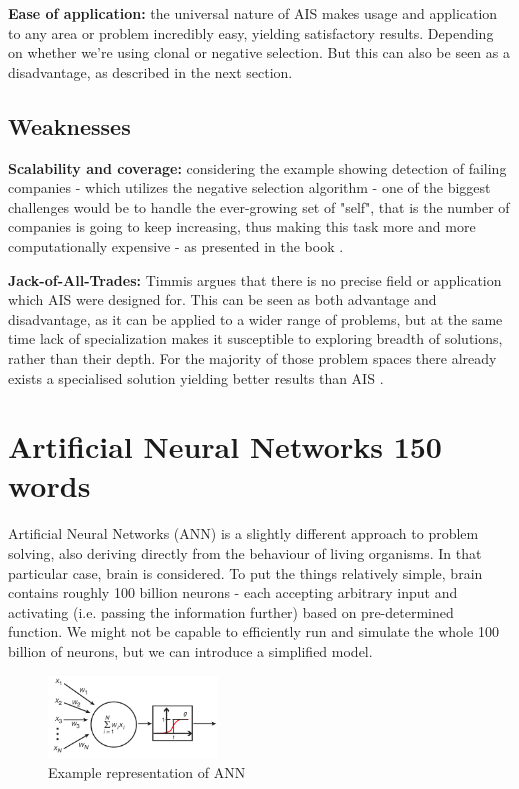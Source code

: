 \documentclass[letterpaper, 10 pt, conference]{ieeeconf}  %
\begin{document}
\textbf{Ease of application:} the universal nature of AIS makes usage and application to any area or problem incredibly easy, yielding satisfactory results. Depending on whether we're using clonal or negative selection. But this can also be seen as a disadvantage, as described in the next section.

\subsection{Weaknesses}
\textbf{Scalability and coverage:} considering the example showing detection of failing companies - which utilizes the negative selection algorithm - one of the biggest challenges would be to handle the ever-growing set of "self", that is the number of companies is going to keep increasing, thus making this task more and more computationally expensive - as presented in the book \cite{brabazon2006biologically}.

\textbf{Jack-of-All-Trades:} Timmis argues \cite{timmis2004overview} that there is no precise field or application which AIS were designed for. This can be seen as both advantage and disadvantage, as it can be applied to a wider range of problems, but at the same time lack of specialization makes it susceptible to exploring breadth of solutions, rather than their depth. For the majority of those problem spaces there already exists a specialised solution yielding better results than AIS \cite{garrett2005we}.

\section{Artificial Neural Networks 150 words}
Artificial Neural Networks (ANN) is a slightly different approach to problem solving, also deriving directly from the behaviour of living organisms. In that particular case, brain is considered. To put the things relatively simple, brain contains roughly 100 billion neurons \cite{lent2012many} - each accepting arbitrary input and activating (i.e. passing the information further) based on pre-determined function. We might not be capable to efficiently run and simulate the whole 100 billion of neurons, but we can introduce a simplified model.

\begin{figure}[h!]
  \centering
  \includegraphics[width=0.4\textwidth]{ann}
  \caption{Example representation of ANN \cite{krogh2008artificial}}
  \label{fig:ann}
\end{figure}
\end{document}
